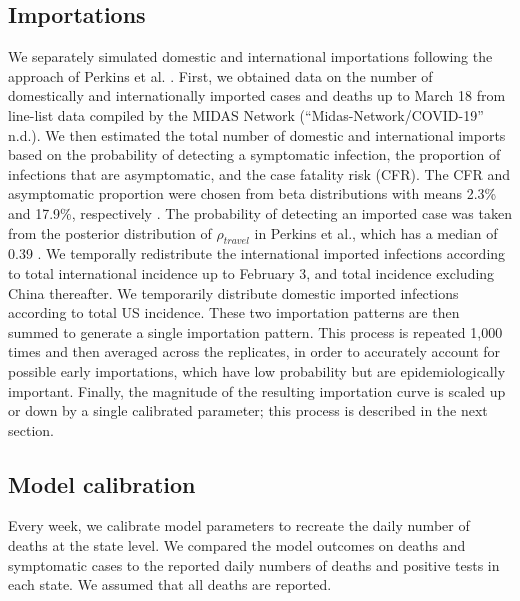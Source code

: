 \documentclass[11pt]{article}
\begin{document}
\subsection{Importations}
We separately simulated domestic and international importations following the approach of Perkins et al. \cite{Perkins2020_MedRxiv}. First, we obtained data on the number of domestically and internationally imported cases and deaths up to March 18 from line-list data compiled by the MIDAS Network (“Midas-Network/COVID-19” n.d.). We then estimated the total number of domestic and international imports based on the probability of detecting a symptomatic infection, the proportion of infections that are asymptomatic, and the case fatality risk (CFR). The CFR and asymptomatic proportion were chosen from beta distributions with means 2.3\% and 17.9\%, respectively \cite{ChinaCDC2020_weekly,Mizumoto2020_Eurosurveillance}. The probability of detecting an imported case was taken from the posterior distribution of $\rho_{travel}$ in Perkins et al., which has a median of 0.39 \cite{Perkins2020_MedRxiv}. We temporally redistribute the international imported infections according to total international incidence up to February 3, and total incidence excluding China thereafter. We temporarily distribute domestic imported infections according to total US incidence. These two importation patterns are then summed to generate a single importation pattern. This process is repeated 1,000 times and then averaged across the replicates, in order to accurately account for possible early importations, which have low probability but are epidemiologically important. Finally, the magnitude of the resulting importation curve is scaled up or down by a single calibrated parameter; this process is described in the next section.

\subsection{Model calibration}
Every week, we calibrate model parameters to recreate the daily number of deaths at the state level. We compared the model outcomes on deaths and symptomatic cases to the reported daily numbers of deaths and positive tests in each state. We assumed that all deaths are reported. 
\end{document}
